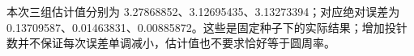 本次三组估计值分别为 3.27868852、3.12695435、3.13273394；对应绝对误差为 0.13709587、0.01463831、0.00885872。这些是固定种子下的实际结果；增加投针数并不保证每次误差单调减小，估计值也不要求恰好等于圆周率。
